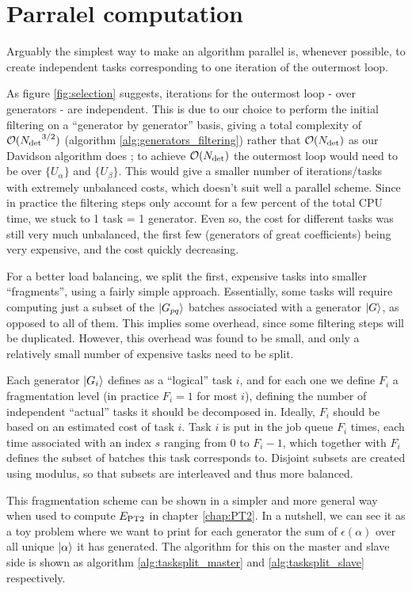 \documentclass[./thesis.tex]{subfiles}
\begin{document}
\section{Parralel computation}

Arguably the simplest way to make an algorithm parallel is, whenever possible, to create independent tasks corresponding to one iteration of the outermost loop. 

As figure \ref{fig:selection} suggests, iterations for the outermost loop - over generators - are independent. This is due to our choice to perform the initial filtering on a ``generator by generator'' basis, giving a total complexity of $\mathcal{O}({N_\text{det}}^{3/2})$ (algorithm \ref{alg:generators_filtering}) rather that $\mathcal{O}({N_\text{det}})$ as our Davidson algorithm does ; to achieve $\mathcal{O}({N_\text{det}})$ the outermost loop would need to be over $\{U_\alpha\}$ and $\{U_\beta\}$. This would give a smaller number of iterations/tasks with extremely unbalanced costs, which doesn't suit well a parallel scheme. Since in practice the filtering steps only account for a few percent of the total CPU time, we stuck to 1 task = 1 generator. Even so, the cost for different tasks was still very much unbalanced, the first few (generators of great coefficients) being very expensive, and the cost quickly decreasing.

For a better load balancing, we split the first, expensive tasks into smaller ``fragments'', using a fairly simple approach. Essentially, some tasks will require computing just a subset of the $\ket {G_{pq}}$ batches associated with a generator $\ket G$, as opposed to all of them. This implies some overhead, since some filtering steps will be duplicated. However, this overhead was found to be small, and only a relatively small number of expensive tasks need to be split.

Each generator $\ket {G_i}$ defines as a ``logical'' task $i$, and for each one we define $F_i$ a fragmentation level (in practice $F_i = 1$ for most $i$), defining the number of independent ``actual'' tasks it should be decomposed in. Ideally, $F_i$ should be based on an estimated cost of task $i$. 
Task $i$ is put in the job queue $F_i$ times, each time associated with an index $s$ ranging from $0$ to $F_i-1$, which together with $F_i$ defines the subset of batches this task corresponds to. Disjoint subsets are created using modulus, so that subsets are interleaved and thus more balanced.
 
This fragmentation scheme can be shown in a simpler and more general way when used to compute $E_\text{PT2}$ in chapter \ref{chap:PT2}. In a nutshell, we can see it as a toy problem where we want to print for each generator the sum of $\epsilon(\alpha)$ over all unique ${\ket{\alpha}}$ it has generated. The algorithm for this on the master and slave side is shown as algorithm \ref{alg:tasksplit_master} and \ref{alg:tasksplit_slave} respectively.
\end{document}
